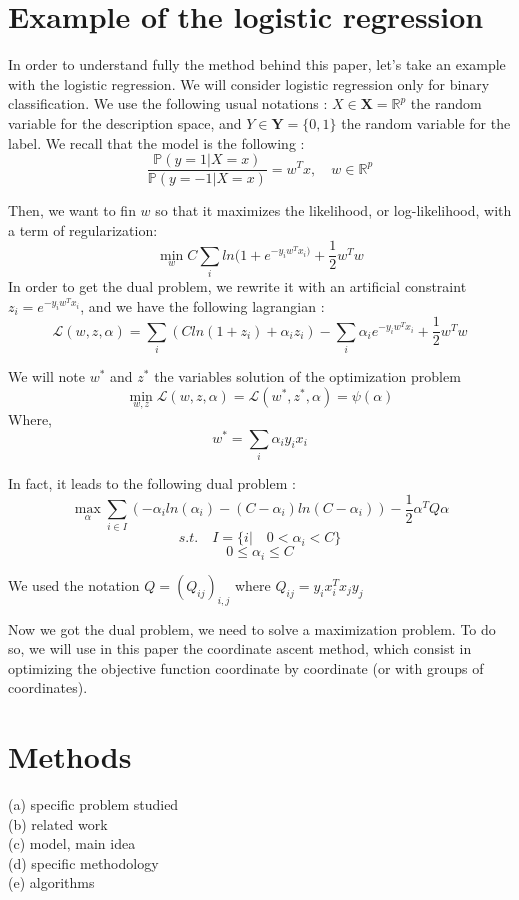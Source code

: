 \documentclass{article}
\begin{document}
\newpage

\section{Example of the logistic regression}


In order to understand fully the method behind this paper, let's take an example with the logistic regression.
We will consider logistic regression only for binary classification.
We use the following usual notations : $X \in \mathbf{X} = \mathbb{R}^p$ the random variable for the description space, and $Y \in \mathbf{Y} = \{0,1\}$ the random variable for the label.
We recall that the model is the following :
$$ \frac{\mathbb{P}(y=1 | X=x)}{\mathbb{P}(y=-1 |X=x)} = w^T x, \quad w \in \mathbb{R}^p $$


Then, we want to fin $w$ so that it maximizes the likelihood, or log-likelihood, with a term of regularization:
$$ \min_w C \sum_i ln(1 + e^{-y_iw^Tx_i)}  + \frac{1}{2} w^Tw$$
In order to get the dual problem, we rewrite it with an artificial constraint $z_i = e^{-y_iw^Tx_i}$, and we have the following lagrangian :
$$ \mathcal{L}(w, z, \alpha) = \sum_i (C ln(1+z_i) + \alpha_i z_i) - \sum_i \alpha_i e^{-y_iw^Tx_i} + \frac{1}{2}w^Tw $$


We will note $w^*$ and $z^*$ the variables solution of the optimization problem
$$ \min_{w, z} \mathcal{L}(w, z, \alpha) = \mathcal{L}(w^*, z^*, \alpha) = \psi(\alpha) $$
Where,
$$ w^* = \sum_i \alpha_i y_i x_i $$

In fact, it leads to the following dual problem :
$$ \max_{\alpha} \sum_{i \in I} (-\alpha_i ln(\alpha_i) - (C-\alpha_i) ln(C - \alpha_i)) - \frac{1}{2} \alpha^TQ\alpha $$
$$ s.t. \quad I = \{i | \quad 0 < \alpha_i < C \}$$
$$0 \leq \alpha_i \leq C$$

We used the notation $Q = (Q_{ij})_{i,j}$ where $Q_{ij} = y_i x_i^T x_j y_j$


Now we got the dual problem, we need to solve a maximization problem.
To do so, we will use in this paper the coordinate ascent method, which consist in optimizing the objective function coordinate by coordinate (or with groups of coordinates). 

\section{Methods}
(a) specific problem studied \\
(b) related work \\
(c) model, main idea \\
(d) specific methodology \\
(e) algorithms \\
\end{document}
